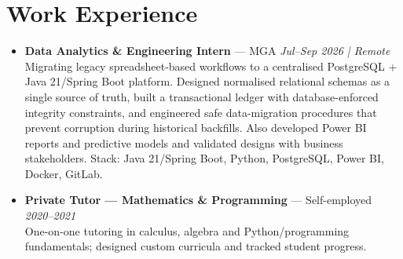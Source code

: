 \documentclass[10pt,a4paper]{article}
\begin{document}
\section{Work Experience}
{\small
\begin{itemize}

  \item \textbf{Data Analytics \& Engineering Intern} --- MGA \hfill \textit{Jul--Sep 2026 | Remote}\\
  Migrating legacy spreadsheet-based workflows to a centralised PostgreSQL + Java 21/Spring Boot platform.
  Designed normalised relational schemas as a single source of truth, built a transactional ledger with
  database-enforced integrity constraints, and engineered safe data-migration procedures that prevent
  corruption during historical backfills. Also developed Power BI reports and predictive models and validated
  designs with business stakeholders. Stack: Java 21/Spring Boot, Python, PostgreSQL, Power BI, Docker, GitLab.

  \item \textbf{Private Tutor --- Mathematics \& Programming} --- Self-employed \hfill \textit{2020--2021}\\
  One-on-one tutoring in calculus, algebra and Python/programming fundamentals;
  designed custom curricula and tracked student progress.

\end{itemize}
}

\end{document}
